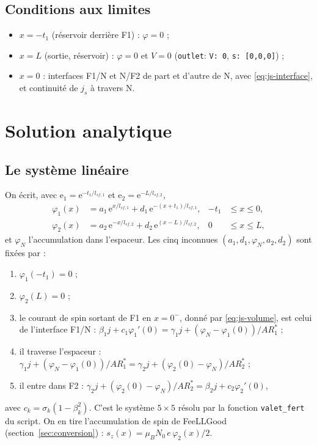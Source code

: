 \documentclass[11pt,a4paper]{article}
\newcommand{\ee}{\mathrm{e}}
\begin{document}
\subsection{Conditions aux limites}

\begin{itemize}
  \item $x = -t_1$ (réservoir derrière F1) : $\varphi = 0$ ;
  \item $x = L$ (sortie, réservoir) : $\varphi = 0$ et $V = 0$
    (\texttt{outlet}: \texttt{V: 0}, \texttt{s: [0,0,0]}) ;
  \item $x = 0$ : interfaces F1/N et N/F2 de part et d'autre de N, avec
    \eqref{eq:js-interface}, et continuité de $j_s$ à travers N.
\end{itemize}

\section{Solution analytique}
\label{sec:analytic}

\subsection{Le système linéaire}

On écrit, avec $\ee_1 = \ee^{-t_1/l_{sf,1}}$ et $\ee_2 = \ee^{-L/l_{sf,2}}$,
\begin{align}
  \varphi_1(x) &= a_1\,\ee^{x/l_{sf,1}} + d_1\,\ee^{-(x+t_1)/l_{sf,1}},
    & -t_1 &\le x\le 0, \\
  \varphi_2(x) &= a_2\,\ee^{-x/l_{sf,2}} + d_2\,\ee^{(x-L)/l_{sf,2}},
    & 0 &\le x\le L,
\end{align}
et $\varphi_N$ l'accumulation dans l'espaceur. Les cinq inconnues
$(a_1, d_1, \varphi_N, a_2, d_2)$ sont fixées par :
\begin{enumerate}
  \item $\varphi_1(-t_1) = 0$ ;
  \item $\varphi_2(L) = 0$ ;
  \item le courant de spin sortant de F1 en $x=0^-$, donné par
    \eqref{eq:js-volume}, est celui de l'interface F1/N :
    $\beta_1 j + c_1\varphi_1'(0) = \gamma_1 j + (\varphi_N-\varphi_1(0))/AR_1^*$ ;
  \item il traverse l'espaceur :
    $\gamma_1 j + (\varphi_N-\varphi_1(0))/AR_1^* =
     \gamma_2 j + (\varphi_2(0)-\varphi_N)/AR_2^*$ ;
  \item il entre dans F2 :
    $\gamma_2 j + (\varphi_2(0)-\varphi_N)/AR_2^* = \beta_2 j + c_2\varphi_2'(0)$,
\end{enumerate}
avec $c_k = \sigma_k(1-\beta_k^2)$. C'est le système $5\times5$ résolu par
la fonction \texttt{valet\_fert} du script. On en tire
l'accumulation de spin de FeeLLGood (section~\ref{sec:conversion}) :
$s_z(x) = \mu_B N_0\,e\,\varphi_2(x)/2$.
\end{document}
